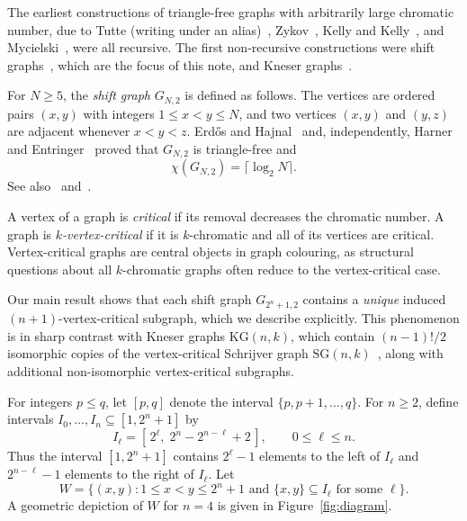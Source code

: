 \documentclass{article}
\begin{document}
The earliest constructions of triangle-free graphs with arbitrarily large chromatic number, due to Tutte (writing under an alias)~\cite{Des47,Des54}, Zykov~\cite{Zyk49}, Kelly and Kelly~\cite{KK54}, and Mycielski~\cite{Myc55}, were all recursive. The first non-recursive constructions were shift graphs~\cite{EH64}, which are the focus of this note, and Kneser graphs~\cite{Lov78}.

For $N \ge 5$, the \emph{shift graph} $G_{N,2}$ is defined as follows. The vertices are ordered pairs $(x,y)$ with integers $1 \le x < y \le N$, and two vertices $(x,y)$ and $(y,z)$ are adjacent whenever $x < y < z$. Erdős and Hajnal~\cite{EH64} and, independently, Harner and Entringer~\cite{HE72} proved that $G_{N,2}$ is triangle-free and
\[
  \chi(G_{N,2}) = \lceil \log_2 N \rceil.
\]
See also~\cite[Problem 9.26]{Lov93} and~\cite{ST11}.

A vertex of a graph is \emph{critical} if its removal decreases the chromatic number. A graph is \emph{$k$-vertex-critical} if it is $k$-chromatic and all of its vertices are critical. Vertex-critical graphs are central objects in graph colouring, as structural questions about all $k$-chromatic graphs often reduce to the vertex-critical case.

Our main result shows that each shift graph $G_{2^n+1,2}$ contains a \emph{unique} induced $(n+1)$-vertex-critical subgraph, which we describe explicitly. This phenomenon is in sharp contrast with Kneser graphs $\mathrm{KG}(n,k)$, which contain $(n-1)!/2$ isomorphic copies of the vertex-critical Schrijver graph $\mathrm{SG}(n,k)$~\cite{Sch78}, along with additional non-isomorphic vertex-critical subgraphs.

For integers $p \le q$, let $[p,q]$ denote the interval $\{p,p+1,\dots,q\}$.  
For $n \ge 2$, define intervals $I_0,\dots,I_n \subseteq [1,2^n+1]$ by
\[
I_\ell = [\,2^\ell,\; 2^n - 2^{n-\ell} + 2\,], \qquad 0 \le \ell \le n.
\]
Thus the interval $[1,2^n+1]$ contains $2^\ell - 1$ elements to the left of $I_\ell$ and $2^{n-\ell} - 1$ elements to the right of $I_\ell$. Let
\[
W = \{(x,y) : 1 \le x < y \le 2^n+1 \text{ and } \{x,y\} \subseteq I_\ell \text{ for some }\ell\}.
\]
A geometric depiction of $W$ for $n=4$ is given in Figure~\ref{fig:diagram}.
\end{document}
